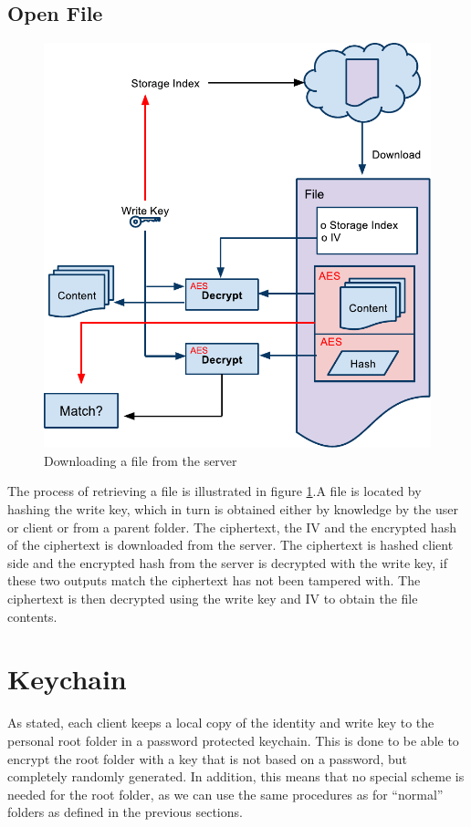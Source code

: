 \documentclass[pdftex,english,10pt,b5paper,twoside]{book}
\begin{document}
\subsection{Open File} 
\begin{figure}[h!]
    \centering
    \includegraphics[width=\columnwidth]{CryptoOpenFile.pdf}
    \caption{Downloading a file from the server}
    \label{fig:CS:OF}
\end{figure}

The process of retrieving a file is illustrated in figure \ref{fig:CS:OF}.A
file is located by hashing the write key, which in turn is obtained either by
knowledge by the user or client or from a parent folder. The ciphertext, the
\ac{IV} and the encrypted hash of the ciphertext is downloaded from the server.
The ciphertext is hashed client side and the encrypted hash from the server is
decrypted with the write key, if these two outputs match the ciphertext has not
been tampered with. The ciphertext is then decrypted using the write key and
\ac{IV} to obtain the file contents.

\section{Keychain}

As stated, each client keeps a local copy of the identity and write key to the
personal root folder in a password protected keychain. This is done to be able
to encrypt the root folder with a key that is not based on a password, but
completely randomly generated. In addition, this means that no special scheme is
needed for the root folder, as we can use the same procedures as for ``normal''
folders as defined in the previous sections.
\end{document}
